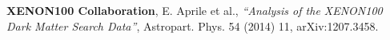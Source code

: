 
\begin{thebibliography}{50}

\textbf{XENON100 Collaboration}, E. Aprile et al., \emph{“Analysis of the XENON100 Dark Matter Search Data”}, Astropart. Phys. 54 (2014) 11, arXiv:1207.3458.

\end{thebibliography}



